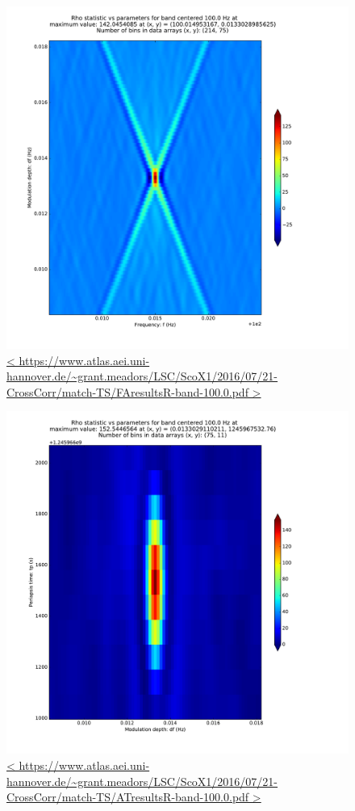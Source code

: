 \documentclass{article}
\begin{document}
\begin{figure}
\includegraphics[trim= 0 0 0 0, clip, width=0.80\paperwidth,keepaspectratio]{plots/match-TS/FAresultsR-band-100-0.pdf}
\caption{
\url{<
https://www.atlas.aei.uni-hannover.de/~grant.meadors/LSC/ScoX1/2016/07/21-CrossCorr/match-TS/FAresultsR-band-100.0.pdf
>}
}
\label{FAcenterGraph}
\end{figure}
\begin{figure}
\includegraphics[trim= 0 0 0 0, clip, width=0.80\paperwidth,keepaspectratio]{plots/match-TS/ATresultsR-band-100-0.pdf}
\caption{
\url{<
https://www.atlas.aei.uni-hannover.de/~grant.meadors/LSC/ScoX1/2016/07/21-CrossCorr/match-TS/ATresultsR-band-100.0.pdf
>}
}
\label{ATcenterGraph}
\end{figure}
\end{document}
